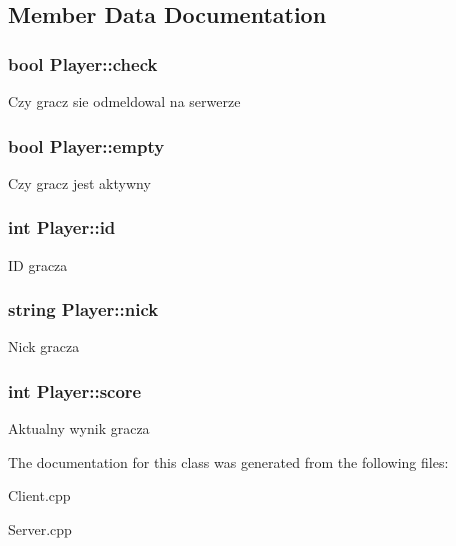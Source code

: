\subsection{Member Data Documentation}
\hypertarget{classPlayer_a1b72316124caf757250c3cee1c4416ff}{
\subsubsection[{check}]{\setlength{\rightskip}{0pt plus 5cm}bool Player\-::check}}\label{classPlayer_a1b72316124caf757250c3cee1c4416ff}
Czy gracz sie odmeldowal na serwerze \hypertarget{classPlayer_a8039b9f17594c036c3bd7b676a24b19e}{
\subsubsection[{empty}]{\setlength{\rightskip}{0pt plus 5cm}bool Player\-::empty}}\label{classPlayer_a8039b9f17594c036c3bd7b676a24b19e}
Czy gracz jest aktywny \hypertarget{classPlayer_a05e05f3a23de78da7ec032ec2bcf8c6c}{
\subsubsection[{id}]{\setlength{\rightskip}{0pt plus 5cm}int Player\-::id}}\label{classPlayer_a05e05f3a23de78da7ec032ec2bcf8c6c}
I\-D gracza \hypertarget{classPlayer_aea2f8abddadf8deb423a3c9b507d1ccc}{
\subsubsection[{nick}]{\setlength{\rightskip}{0pt plus 5cm}string Player\-::nick}}\label{classPlayer_aea2f8abddadf8deb423a3c9b507d1ccc}
Nick gracza \hypertarget{classPlayer_ace6abae8d66534ad0a1fd6458f786a6e}{
\subsubsection[{score}]{\setlength{\rightskip}{0pt plus 5cm}int Player\-::score}}\label{classPlayer_ace6abae8d66534ad0a1fd6458f786a6e}
Aktualny wynik gracza 

The documentation for this class was generated from the following files\-:\begin{DoxyCompactItemize}
\item 
Client.\-cpp\item 
Server.\-cpp\end{DoxyCompactItemize}
